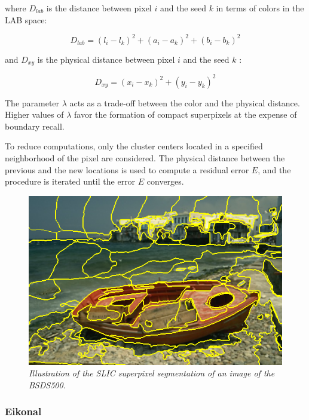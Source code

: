 \documentclass{article}
\begin{document}
where $D_{lab}$ is the distance between pixel $i$ and the seed $k$ in terms of colors in the LAB space:

            $$
            D_{lab} = (l_i - l_k)^2 + (a_i - a_k)^2 + (b_i - b_k)^2
            $$

and $D_{xy}$ is the physical distance between pixel $i$ and the seed $k$ :

            $$
            D_{xy} = (x_i - x_k)^2 + (y_i - y_k)^2
            $$

            The parameter $\lambda $ acts as a trade-off between the color and the physical distance. Higher values of $\lambda $ favor the formation of compact superpixels at the expense of boundary recall.


            To reduce computations, only the cluster centers located in a specified neighborhood of the pixel are considered. The physical distance between the previous and the new locations is used to compute a residual error $E$, and the procedure is iterated until the error $E$ converges.

            \begin{figure}[!ht]
                \centering
                \includegraphics[width=.5\linewidth]{pics/slic.png}
                \caption{\textit{Illustration of the SLIC superpixel segmentation of an image of the BSDS500.}}
            \end{figure}

        \subsubsection{Eikonal}
\end{document}
